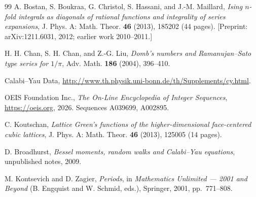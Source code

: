 \documentclass[12pt,a4paper]{article}
\numberwithin{equation}{section}
\theoremstyle{plain}
\theoremstyle{definition}
\theoremstyle{remark}
\begin{document}
\begin{thebibliography}{99}
A. Bostan, S. Boukraa, G. Christol, S. Hassani, and J.-M. Maillard,
\emph{Ising $n$-fold integrals as diagonals of rational functions and integrality of series expansions},
J. Phys. A: Math. Theor. \textbf{46} (2013), 185202 (44 pages).
[Preprint: arXiv:1211.6031, 2012; earlier work 2010--2011.]

H. H. Chan, S. H. Chan, and Z.-G. Liu,
\emph{Domb's numbers and Ramanujan--Sato type series for $1/\pi$},
Adv. Math. \textbf{186} (2004), 396--410.

Calabi--Yau Data,
\url{http://www.th.physik.uni-bonn.de/th/Supplements/cy.html}.

OEIS Foundation Inc.,
\emph{The On-Line Encyclopedia of Integer Sequences},
\url{https://oeis.org}, 2026.
Sequences A039699, A002895.

C. Koutschan,
\emph{Lattice Green's functions of the higher-dimensional face-centered cubic lattices},
J. Phys. A: Math. Theor. \textbf{46} (2013), 125005 (14 pages).

D. Broadhurst,
\emph{Bessel moments, random walks and Calabi--Yau equations},
unpublished notes, 2009.

M. Kontsevich and D. Zagier,
\emph{Periods},
in \emph{Mathematics Unlimited --- 2001 and Beyond} (B. Engquist and W. Schmid, eds.),
Springer, 2001, pp.\ 771--808.

\end{thebibliography}

\end{document}
